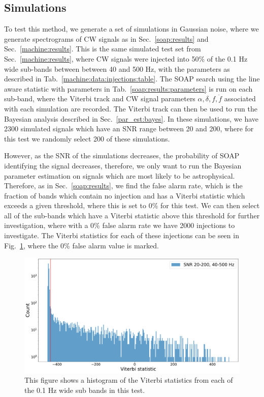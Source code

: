 \subsection{\label{par_est:results:simulations}Simulations}
%
%
To test this method, we generate a set of simulations in Gaussian noise, where we generate spectrograms of \gls{CW} signals as in Sec.~\ref{soap:results} and Sec.~\ref{machine:results}.
This is the same simulated test set from Sec.~\ref{machine:results}, where \gls{CW} signals were injected into 50\% of the 0.1 Hz wide sub-bands between between 40 and 500 Hz, with the parameters as described in Tab.~\ref{machine:data:injections:table}. 
The SOAP search using the line aware statistic with parameters in Tab.~\ref{soap:results:parameters} is run on each sub-band, where the Viterbi track and \gls{CW} signal parameters $\alpha, \delta, f, \dot{f}$ associated with each simulation are recorded.
The Viterbi track can then be used to run the Bayesian analysis described in Sec.~\ref{par_est:bayes}.
In these simulations, we have 2300 simulated signals which have an \gls{SNR} range between 20 and 200, where for this test we randomly select 200 of these simulations.

\if
However, as the \gls{SNR} of the simulations decreases, the probability of SOAP identifying the signal decreases, therefore, we only want to run the Bayesian parameter estimation on signals which are most likely to be astrophysical.
Therefore, as in Sec.~\ref{soap:results}, we find the false alarm rate, which is the fraction of bands which contain no injection and has a Viterbi statistic which exceeds a given threshold, where this is set to 0\% for this test.
We can then select all of the sub-bands which have a Viterbi statistic above this threshold for further investigation, where with a 0\% false alarm rate we have 2000  injections to investigate.
The Viterbi statistics for each of these injections can be seen in Fig.~\ref{par_est:results:all_viterbi}, where the 0\% false alarm value is marked.
%
\begin{figure}
    \centering
    \includegraphics[width=\linewidth]{C5_parameter/viterbi_hist.pdf}
    \caption[All Viterbi statistics]{This figure shows a histogram of the Viterbi statistics from each of the 0.1 Hz wide sub bands in this test. }
    \label{par_est:results:all_viterbi}
\end{figure}
\fi


